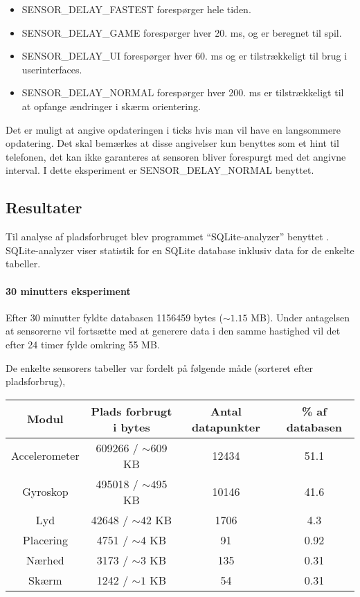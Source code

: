 \begin{itemize}
	\item SENSOR\_DELAY\_FASTEST forespørger hele tiden.
	\item SENSOR\_DELAY\_GAME forespørger hver 20. ms, og er beregnet til spil.
	\item SENSOR\_DELAY\_UI forespørger hver 60. ms og er tilstrækkeligt til brug i userinterfaces.
	\item SENSOR\_DELAY\_NORMAL forespørger hver 200. ms er tilstrækkeligt til at opfange ændringer i skærm orientering.
\end{itemize}
Det er muligt at angive opdateringen i ticks hvis man vil have en langsommere opdatering.
Det skal bemærkes at disse angivelser kun benyttes som et hint til telefonen, det kan ikke garanteres at sensoren bliver forespurgt med det angivne interval.
I dette eksperiment er SENSOR\_DELAY\_NORMAL benyttet.


\subsection{Resultater}
Til analyse af pladsforbruget blev programmet ``SQLite-analyzer'' benyttet \cite{sqliteanalyzer}.
SQLite-analyzer viser statistik for en SQLite database inklusiv data for de enkelte tabeller.

\paragraph{30 minutters eksperiment}
Efter 30 minutter fyldte databasen 1156459 bytes ($\sim 1.15$ MB).
Under antagelsen at sensorerne vil fortsætte med at generere data i den samme hastighed vil det efter 24 timer fylde omkring 55 MB. 

De enkelte sensorers tabeller var fordelt på følgende måde (sorteret efter pladsforbrug),

\begin{tabular}{|c|c|c|c|}
	\hline Modul 			& Plads forbrugt i bytes	& Antal datapunkter  & \% af databasen \\
	\hline Accelerometer 	& 609266 / $\sim 609$ KB	& 12434 			 & 51.1 \\ 
	\hline Gyroskop 		& 495018 / $\sim 495$ KB	& 10146 			 & 41.6\\ 
	\hline Lyd 				& 42648  / $\sim 42$ KB		& 1706 			 	 & 4.3 \\ 
	\hline Placering 		& 4751 	 / $\sim 4$ KB		& 91 				 & 0.92 \\ 
	\hline Nærhed    		& 3173 	 / $\sim 3$ KB		& 135 				 & 0.31 \\ 
	\hline Skærm 			& 1242 	 / $\sim 1$	KB		& 54				 & 0.31 \\ 
	\hline 
\end{tabular} 

